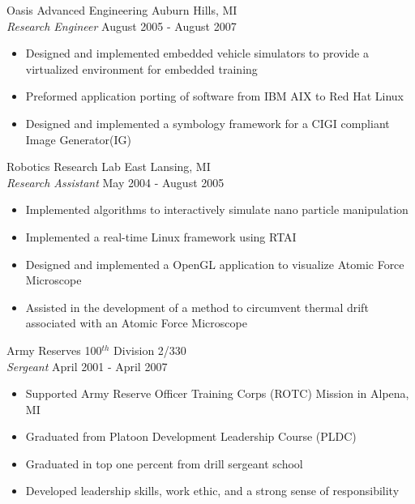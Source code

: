 \documentclass[line]{res}
\begin{document}
\begin{resume}
    \vspace{-2mm}
    Oasis Advanced Engineering \hfill Auburn Hills, MI\\
    {\sl Research Engineer} \hfill August 2005 - August 2007
    \vspace{1mm}
    \begin{itemize} 
      \item Designed and implemented embedded vehicle simulators to 
      provide a virtualized environment for embedded training  
      \item Preformed application porting of software from IBM AIX to Red Hat
      Linux
      \item Designed and implemented a symbology framework for a CIGI compliant
      Image Generator(IG)
    \end{itemize}

    \vspace{-2mm}
    Robotics Research Lab \hfill East Lansing, MI\\
    {\sl Research Assistant} \hfill May 2004 - August 2005
    \vspace{1mm}
    \begin{itemize} 
      \item Implemented algorithms to interactively simulate nano
        particle manipulation
      \item Implemented a real-time Linux framework using RTAI
      \item Designed and implemented a OpenGL application to visualize Atomic Force Microscope 
      \item Assisted in the development of a method to circumvent thermal drift
      associated with an Atomic Force Microscope
    \end{itemize}

    \vspace{-2mm}
    Army Reserves \hfill 100$^{th}$ Division 2/330\\
    {\sl Sergeant} \hfill April 2001 - April 2007
    \vspace{1mm}
    \begin{itemize} 
      \item Supported Army Reserve Officer Training Corps (ROTC) Mission in Alpena, MI
      \item Graduated from Platoon Development Leadership Course (PLDC)
      \item Graduated in top one percent from drill sergeant school
      \item Developed leadership skills, work ethic, and a strong sense of
      responsibility      
    \end{itemize}


\end{resume}
\end{document}
